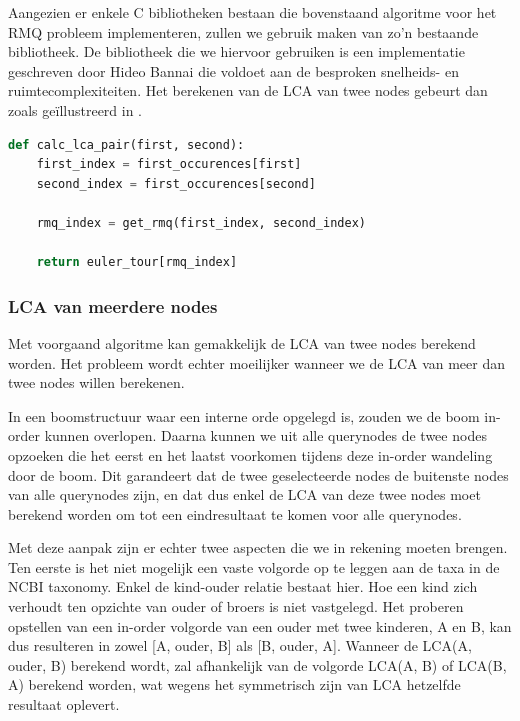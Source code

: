 Aangezien er enkele C bibliotheken bestaan die bovenstaand algoritme voor het
RMQ probleem implementeren, zullen we gebruik maken van zo'n bestaande
bibliotheek. De bibliotheek die we hiervoor gebruiken is een implementatie
geschreven door Hideo Bannai \cite{Hideo0:online, Hideo1:online} die voldoet aan
de besproken snelheids- en ruimtecomplexiteiten. Het berekenen van de
LCA van twee nodes gebeurt dan zoals geïllustreerd in .

\begin{lstlisting}[language=Python, caption={Voorbeeldcode in Python voor de 
LCA berekening van 2 nodes, na uitvoering van \Vref{lst:dfsrun}},
label={lst:lcaexample}, float]
def calc_lca_pair(first, second):
    first_index = first_occurences[first]
    second_index = first_occurences[second]
    
    rmq_index = get_rmq(first_index, second_index)
    
    return euler_tour[rmq_index]
\end{lstlisting}

\subsubsection{LCA van meerdere nodes} 

Met voorgaand algoritme kan gemakkelijk de LCA van twee nodes berekend worden.
Het probleem wordt echter moeilijker wanneer we de LCA van meer dan twee nodes
willen berekenen.

In een boomstructuur waar een interne orde opgelegd is, zouden we de boom
in-order kunnen overlopen. Daarna kunnen we uit alle querynodes de twee nodes
opzoeken die het eerst en het laatst voorkomen tijdens deze in-order wandeling
door de boom. Dit garandeert dat de twee geselecteerde nodes de buitenste nodes
van alle querynodes zijn, en dat dus enkel de LCA van deze twee nodes moet
berekend worden om tot een eindresultaat te komen voor alle querynodes.

Met deze aanpak zijn er echter twee aspecten die we in rekening moeten brengen.
Ten eerste is het niet mogelijk een vaste volgorde op te leggen aan de taxa in
de NCBI taxonomy. Enkel de kind-ouder relatie bestaat hier. Hoe een kind zich
verhoudt ten opzichte van ouder of broers is niet vastgelegd. Het proberen
opstellen van een in-order volgorde van een ouder met twee kinderen, A en B, kan
dus resulteren in zowel [A, ouder, B] als [B, ouder, A]. Wanneer de LCA(A,
ouder, B) berekend wordt, zal afhankelijk van de volgorde LCA(A, B) of LCA(B, A)
berekend worden, wat wegens het symmetrisch zijn van LCA hetzelfde resultaat
oplevert.

